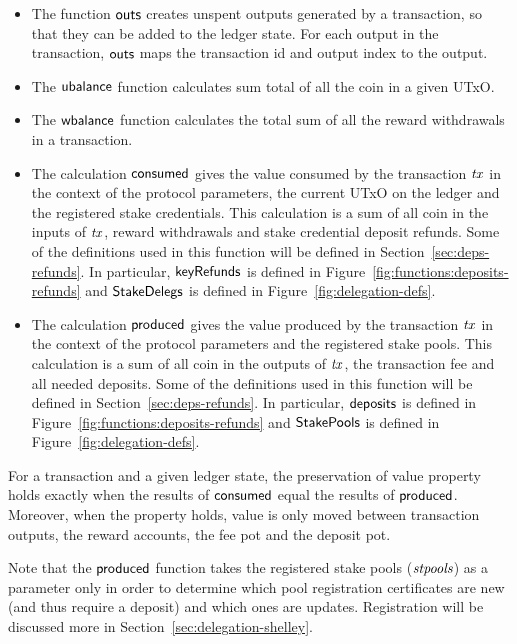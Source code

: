 \begin{itemize}

  \item
    The function $\mathsf{outs}$ creates unspent outputs generated by a transaction, so that
    they can be added to the ledger state.  For each output in the transaction,
    $\mathsf{outs}$ maps the transaction id and output index to the output.

  \item
    The $\mathsf{ubalance}$ function calculates sum total of all the coin in a given UTxO.
  \item
    The $\mathsf{wbalance}$ function calculates the total sum of all the reward withdrawals in a
    transaction.

  \item The calculation $\mathsf{consumed}$ gives the value consumed by the
    transaction $\mathit{tx}$ in the context of the protocol parameters, the
    current UTxO on the ledger and the registered stake credentials. This
    calculation is a sum of all coin in the inputs of $\mathit{tx}$, reward
    withdrawals and stake credential deposit refunds. Some of the definitions
    used in this function will be defined in Section~\ref{sec:deps-refunds}. In
    particular, $\mathsf{keyRefunds}$ is defined in
    Figure~\ref{fig:functions:deposits-refunds} and $\mathsf{StakeDelegs}$ is defined in
    Figure~\ref{fig:delegation-defs}.

  \item The calculation $\mathsf{produced}$ gives the value produced by the transaction $\mathit{tx}$
    in the context of the protocol parameters and the registered stake pools.
    This calculation is a sum of all coin in the outputs of $\mathit{tx}$,
    the transaction fee and all needed deposits.
    Some of the definitions used in this function will be defined in
    Section~\ref{sec:deps-refunds}.
    In particular, $\mathsf{deposits}$ is defined in Figure~\ref{fig:functions:deposits-refunds}
    and $\mathsf{StakePools}$ is defined in Figure~\ref{fig:delegation-defs}.
\end{itemize}

For a transaction and a given ledger state, the preservation of value property holds
exactly when the results of $\mathsf{consumed}$ equal the results of $\mathsf{produced}$.
Moreover, when the property holds, value is only moved between transaction outputs,
the reward accounts, the fee pot and the deposit pot.

Note that the $\mathsf{produced}$ function takes the registered stake pools ($\mathit{stpools}$)
as a parameter only in order to determine which pool registration certificates are
new (and thus require a deposit) and which ones are updates.
Registration will be discussed more in Section~\ref{sec:delegation-shelley}.


